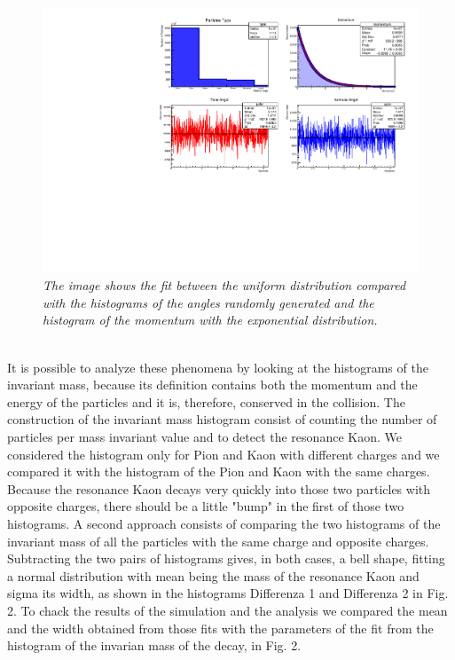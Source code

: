 \documentclass[a4paper, 11pt]{article}
\begin{document}
    \begin{figure}[h!]
      \centering
      \includegraphics[width=.8\linewidth]{can.pdf}
      \caption{\label{f2} \textit{The image shows the fit between the uniform distribution compared with the histograms of the angles randomly generated and the histogram of the momentum with the exponential distribution.}}
    \end{figure}
    \\
    It is possible to analyze these phenomena by looking at the histograms of the invariant mass, because its definition contains both the momentum and the energy of the particles and it is, therefore, conserved in the collision. The construction of the invariant mass histogram consist of counting the number of particles per mass invariant value and to detect the resonance Kaon. We considered the histogram only for Pion and Kaon with different charges and we compared it with the histogram of the Pion and Kaon with the same charges. Because the resonance Kaon decays very quickly into those two particles with opposite charges, there should be a little "bump" in the first of those two histograms.
    A second approach consists of comparing the two histograms of the invariant mass of all the particles with the same charge and opposite charges.
    \\
    Subtracting the two pairs of histograms gives, in both cases, a bell shape, fitting a normal distribution with mean being the mass of the resonance Kaon and sigma its width, as shown in the histograms Differenza 1 and Differenza 2 in Fig. 2. To chack the results of the simulation and the analysis we compared the mean and the width obtained from those fits with the parameters of the fit from the histogram of the invarian mass of the decay, in Fig. 2. \\
\end{document}
